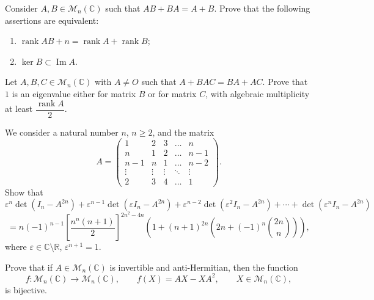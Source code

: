 \documentclass[12pt]{article}
\begin{document}
\begin{problem}
Consider $A, B \in \mathcal{M}_n(\mathbb{C})$ such that $AB+BA = A+B$. Prove that the following assertions are equivalent:
\begin{enumerate}[label=\alph*)]
\item $\operatorname{rank}AB + n = \operatorname{rank}A + \operatorname{rank}B$;
\item $\ker B \subset \operatorname{Im}A$.
\end{enumerate}
\end{problem}

\begin{problem}
Let $A,B,C \in \mathcal{M}_n(\mathbb{C})$ with $A \ne O$ such that $A + BAC = BA + AC$. Prove that $1$ is an eigenvalue either for matrix $B$ or for matrix $C$, with algebraic multiplicity at least $\dfrac{\operatorname{rank}A}{2}$.
\end{problem}

\begin{problem}
We consider a natural number $n$, $n \ge 2$, and the matrix
\[
A =
\begin{pmatrix}
1 & 2 & 3 & \dots & n \\
n & 1 & 2 & \dots & n-1 \\
n-1 & n & 1 & \dots & n-2 \\
\vdots & \vdots & \vdots & \ddots & \vdots \\
2 & 3 & 4 & \dots & 1
\end{pmatrix}.
\]
Show that
\[
\varepsilon^n \det\!\left(I_n - A^{2n}\right) + \varepsilon^{n-1}\det\!\left(\varepsilon I_n - A^{2n}\right) + \varepsilon^{n-2}\det\!\left(\varepsilon^2 I_n - A^{2n}\right) + \cdots + \det\!\left(\varepsilon^n I_n - A^{2n}\right)
\]
\[
= n(-1)^{n-1}\left[\frac{n^n(n+1)}{2}\right]^{2n^2-4n}\left(1+(n+1)^{2n}\left(2n+(-1)^n\binom{2n}{n}\right)\right),
\]
where $\varepsilon \in \mathbb{C}\setminus\mathbb{R}$, $\varepsilon^{n+1}=1$.
\end{problem}

\begin{problem}
Prove that if $A \in \mathcal{M}_n(\mathbb{C})$ is invertible and anti-Hermitian, then the function
\[
f : \mathcal{M}_n(\mathbb{C}) \to \mathcal{M}_n(\mathbb{C}), \qquad f(X) = AX - XA^2, \qquad X \in \mathcal{M}_n(\mathbb{C}),
\]
is bijective.
\end{problem}
\end{document}
